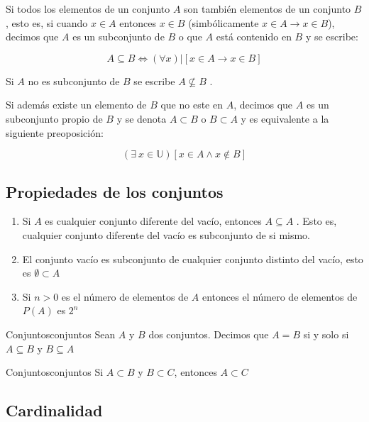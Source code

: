 Si todos los elementos de un conjunto $A$ son también elementos de un conjunto
$B$, esto es, si cuando $x \in A$ entonces $x \in B$ (simbólicamente $x \in A
\rightarrow x \in B$), decimos que $A$ es un subconjunto de $B$ o que $A$ está
contenido en $B$ y se escribe:

\begin{equation}
    A \subseteq B \iff (\forall x)|[x \in A \rightarrow x \in B]
\end{equation}

Si $A$ no es subconjunto de $B$ se escribe $A \not \subseteq B$ .

Si además existe un elemento de $B$ que no este en $A$, decimos que $A$ es un
subconjunto propio de $B$ y se denota $A \subset B$ o $B \subset A$ y es
equivalente a la siguiente preoposición:

\begin{equation}
    (\exists \ x \in \mathbb U)[x \in A \land x \not\in B]
\end{equation}

\subsection*{Propiedades de los conjuntos}

\begin{enumerate}
    \item Si $A$ es cualquier conjunto diferente del vacío, entonces $A \subseteq A$ .
    Esto es, cualquier conjunto diferente del vacío es subconjunto de si mismo.

    \item El conjunto vacío es subconjunto de cualquier conjunto distinto del vacío,
    esto es $\emptyset \subset A$

    \item Si $n>0$ es el número de elementos de $A$ entonces el número de elementos
de $P(A)$ es $2^n$
\end{enumerate}

\begin{theorem}{Conjuntos}{conjuntos}
Sean $A$ y $B$ dos conjuntos. Decimos que $A=B$ si y solo si $A \subseteq B$ y
$B \subseteq A$
\end{theorem}

\begin{theorem}{Conjuntos}{conjuntos}
    Si $ A \subset B $ y $ B \subset C $, entonces $ A \subset C $
\end{theorem}

\subsection*{Cardinalidad}

